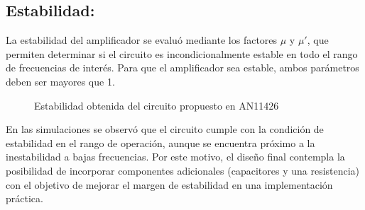 \subsection{Estabilidad:}
La estabilidad del amplificador se evaluó mediante los factores $\mu$ y $\mu'$, que permiten determinar si el circuito es incondicionalmente estable en todo el rango de frecuencias de interés. Para que el amplificador sea estable, ambos parámetros deben ser mayores que 1.
\begin{figure}[htbp]
\centering
{}
\caption{Estabilidad obtenida del circuito propuesto en AN11426}
\label{fig:nf_vs_freq}
\end{figure}
En las simulaciones se observó que el circuito cumple con la condición de estabilidad en el rango de operación, aunque se encuentra próximo a la inestabilidad a bajas frecuencias. Por este motivo, el diseño final contempla la posibilidad de incorporar componentes adicionales (capacitores y una resistencia) con el objetivo de mejorar el margen de estabilidad en una implementación práctica.
